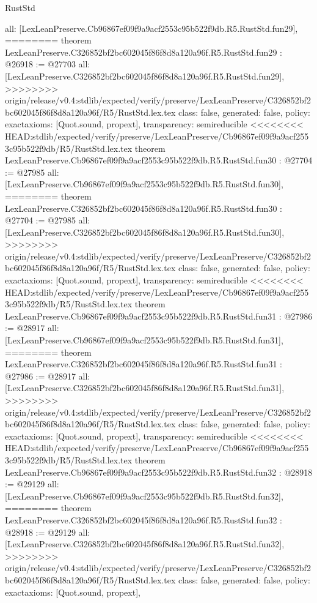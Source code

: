 \begin{lexlean}{RustStd}
\begin{coremodule}
{\begin{coremodule}
{{{{{{{{{{{{{{{{{{{{{{{{{{{{{{{{  all: [LexLeanPreserve.Cb96867ef09f9a9acf2553c95b522f9db.R5.RustStd.fun29],
========
theorem LexLeanPreserve.C326852bf2bc602045f86f8d8a120a96f.R5.RustStd.fun29 : @26918 := @27703 {
  all: [LexLeanPreserve.C326852bf2bc602045f86f8d8a120a96f.R5.RustStd.fun29],
>>>>>>>> origin/release/v0.4:stdlib/expected/verify/preserve/LexLeanPreserve/C326852bf2bc602045f86f8d8a120a96f/R5/RustStd.lex.tex
  class: false,
  generated: false,
  policy: exact{axioms: [Quot.sound, propext]},
  transparency: semireducible
}
<<<<<<<< HEAD:stdlib/expected/verify/preserve/LexLeanPreserve/Cb96867ef09f9a9acf2553c95b522f9db/R5/RustStd.lex.tex
theorem LexLeanPreserve.Cb96867ef09f9a9acf2553c95b522f9db.R5.RustStd.fun30 : @27704 := @27985 {
  all: [LexLeanPreserve.Cb96867ef09f9a9acf2553c95b522f9db.R5.RustStd.fun30],
========
theorem LexLeanPreserve.C326852bf2bc602045f86f8d8a120a96f.R5.RustStd.fun30 : @27704 := @27985 {
  all: [LexLeanPreserve.C326852bf2bc602045f86f8d8a120a96f.R5.RustStd.fun30],
>>>>>>>> origin/release/v0.4:stdlib/expected/verify/preserve/LexLeanPreserve/C326852bf2bc602045f86f8d8a120a96f/R5/RustStd.lex.tex
  class: false,
  generated: false,
  policy: exact{axioms: [Quot.sound, propext]},
  transparency: semireducible
}
<<<<<<<< HEAD:stdlib/expected/verify/preserve/LexLeanPreserve/Cb96867ef09f9a9acf2553c95b522f9db/R5/RustStd.lex.tex
theorem LexLeanPreserve.Cb96867ef09f9a9acf2553c95b522f9db.R5.RustStd.fun31 : @27986 := @28917 {
  all: [LexLeanPreserve.Cb96867ef09f9a9acf2553c95b522f9db.R5.RustStd.fun31],
========
theorem LexLeanPreserve.C326852bf2bc602045f86f8d8a120a96f.R5.RustStd.fun31 : @27986 := @28917 {
  all: [LexLeanPreserve.C326852bf2bc602045f86f8d8a120a96f.R5.RustStd.fun31],
>>>>>>>> origin/release/v0.4:stdlib/expected/verify/preserve/LexLeanPreserve/C326852bf2bc602045f86f8d8a120a96f/R5/RustStd.lex.tex
  class: false,
  generated: false,
  policy: exact{axioms: [Quot.sound, propext]},
  transparency: semireducible
}
<<<<<<<< HEAD:stdlib/expected/verify/preserve/LexLeanPreserve/Cb96867ef09f9a9acf2553c95b522f9db/R5/RustStd.lex.tex
theorem LexLeanPreserve.Cb96867ef09f9a9acf2553c95b522f9db.R5.RustStd.fun32 : @28918 := @29129 {
  all: [LexLeanPreserve.Cb96867ef09f9a9acf2553c95b522f9db.R5.RustStd.fun32],
========
theorem LexLeanPreserve.C326852bf2bc602045f86f8d8a120a96f.R5.RustStd.fun32 : @28918 := @29129 {
  all: [LexLeanPreserve.C326852bf2bc602045f86f8d8a120a96f.R5.RustStd.fun32],
>>>>>>>> origin/release/v0.4:stdlib/expected/verify/preserve/LexLeanPreserve/C326852bf2bc602045f86f8d8a120a96f/R5/RustStd.lex.tex
  class: false,
  generated: false,
  policy: exact{axioms: [Quot.sound, propext]},
}}}}}}}}}}}}}}}}}}}}}}}}}}}}}}}}}}}}
\end{coremodule}}
\end{coremodule}
\end{lexlean}
